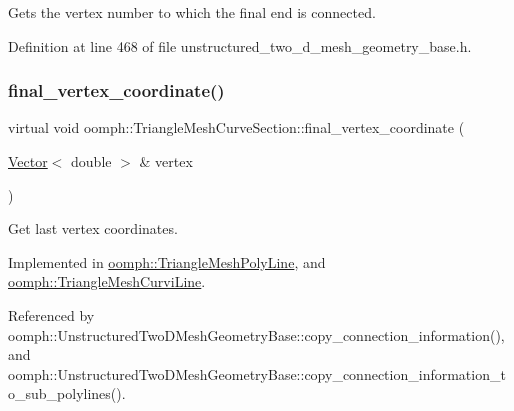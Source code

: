 Gets the vertex number to which the final end is connected. 



Definition at line 468 of file unstructured\+\_\+two\+\_\+d\+\_\+mesh\+\_\+geometry\+\_\+base.\+h.

\mbox{\label{classoomph_1_1TriangleMeshCurveSection_aa5bbea1d7c1157f25d3b93101ac4b80f}} 
\subsubsection{\texorpdfstring{final\+\_\+vertex\+\_\+coordinate()}{final\_vertex\_coordinate()}}
{\footnotesize\ttfamily virtual void oomph\+::\+Triangle\+Mesh\+Curve\+Section\+::final\+\_\+vertex\+\_\+coordinate (\begin{DoxyParamCaption}\item[{\hyperlink{classoomph_1_1Vector}{Vector}$<$ double $>$ \&}]{vertex }\end{DoxyParamCaption})\hspace{0.3cm}{\ttfamily [pure virtual]}}



Get last vertex coordinates. 



Implemented in \hyperlink{classoomph_1_1TriangleMeshPolyLine_a6a110bac1436632fc4206eec2a96f8f4}{oomph\+::\+Triangle\+Mesh\+Poly\+Line}, and \hyperlink{classoomph_1_1TriangleMeshCurviLine_a6a2437a4fb8c17ccc02a82311d477ca0}{oomph\+::\+Triangle\+Mesh\+Curvi\+Line}.



Referenced by oomph\+::\+Unstructured\+Two\+D\+Mesh\+Geometry\+Base\+::copy\+\_\+connection\+\_\+information(), and oomph\+::\+Unstructured\+Two\+D\+Mesh\+Geometry\+Base\+::copy\+\_\+connection\+\_\+information\+\_\+to\+\_\+sub\+\_\+polylines().

\mbox{\label{classoomph_1_1TriangleMeshCurveSection_adca140a1a261a98649d1af4a5d3e6cb8}} 
